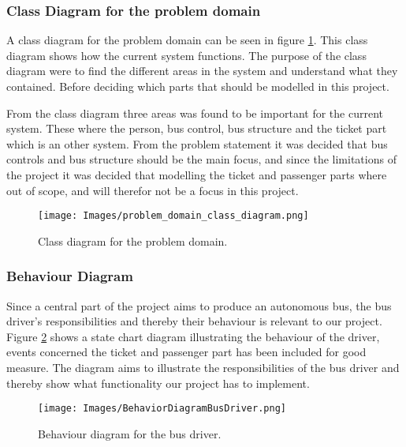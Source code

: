 \subsubsection{Class Diagram for the problem domain}
A class diagram for the problem domain can be seen in figure \ref{problem-domain-class-diagram}. This class diagram shows how the current system functions. The purpose of the class diagram were to find the different areas in the system and understand what they contained. Before deciding which parts that should be modelled in this project.

From the class diagram three areas was found to be important for the current system. These where the person, bus control, bus structure and the ticket part which is an other system. From the problem statement it was decided that bus controls and bus structure should be the main focus, and since the limitations of the project it was decided that modelling the ticket and passenger parts where out of scope, and will therefor not be a focus in this project. 


\begin{figure}[H]
\centering
\texttt{[image: Images/problem\_domain\_class\_diagram.png]}
\caption{Class diagram for the problem domain.}
\label{problem-domain-class-diagram}
\end{figure}


\subsubsection{Behaviour Diagram}
Since a central part of the project aims to produce an autonomous bus, the bus driver's responsibilities and thereby their behaviour is relevant to our project. Figure \ref{BehaviorDiagramBusDriver} shows a state chart diagram illustrating the behaviour of the driver, events concerned the ticket and passenger part has been included for good measure. The diagram aims to illustrate the responsibilities of the bus driver and thereby show what functionality our project has to implement.

\begin{figure}[H]
\centering
\texttt{[image: Images/BehaviorDiagramBusDriver.png]}
\caption{Behaviour diagram for the bus driver.}
\label{BehaviorDiagramBusDriver}
\end{figure}

